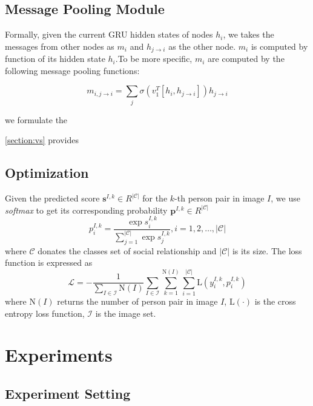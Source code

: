 \documentclass{article}
\begin{document}
\subsection{Message Pooling Module} \label{section:mp}

Formally, given the current GRU hidden states of nodes $h_i$, we takes the messages from other nodes as $m_i$ and $h_{j \to i}$ as the other node. $m_{i}$ is computed by function of its hidden state $h_i$.To be more specific, $m_i$ are computed by the following message pooling functions:

\begin{equation}
	m_{i,j \to i} = \sum_{j} \sigma{(v_1^T[h_i,h_{j \to i}])h_{j \to i}}	
\end{equation}

we formulate the 

\ref{section:vs} provides 

\subsection{Optimization}

Given the predicted score $\mathbf{s}^{I,k} \in R^{|\mathcal{C}|}$ for the $k$-th person pair in image $I$, we use {\it softmax} to get its corresponding probability $\mathbf{p}^{I,k} \in R^{|\mathcal{C}|}$
\begin{equation}
  \label{eq:prob_eq}
  p_i^{I,k} = \frac{\exp{s_i^{I,k}}}{\sum_{j=1}^{|\mathcal{C}|}{\exp{s_j^{I,k}}}}, i=1,2,\dots,|\mathcal{C}|
\end{equation}
where $\mathcal{C}$ donates the classes set of social relationship and $|\mathcal{C}|$ is its size. The loss function is expressed as
\begin{equation}
  \label{eq:loss_eq}
  \mathcal{L} = - \frac{1}{\sum_{I \in \mathcal{I}}\text{N}(I)} \sum_{I \in \mathcal{I}} \sum_{k=1}^{\text{N}(I)} \sum_{i=1}^{|\mathcal{C}|} \text{L}(y_{i}^{I,k}, p_{i}^{I,k})
\end{equation}
where $\text{N}(I)$ returns the number of person pair in image $I$, $\text{L}(\cdot)$ is the cross entropy loss function, $\mathcal{I}$ is the image set.

\section{Experiments}

\subsection{Experiment Setting}
\end{document}
